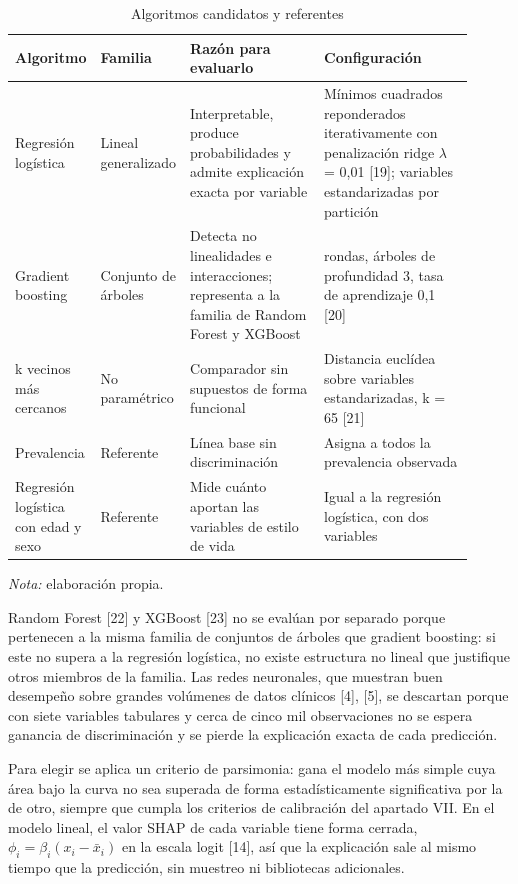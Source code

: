 \documentclass[conference]{IEEEtran}
\begin{document}
\begin{table}[!t]
\centering
\caption{Algoritmos candidatos y referentes}
\footnotesize
\renewcommand{\arraystretch}{1.15}
\begin{tabular}{>{\raggedright\arraybackslash}p{0.110\linewidth}>{\raggedright\arraybackslash}p{0.110\linewidth}>{\raggedright\arraybackslash}p{0.325\linewidth}>{\raggedright\arraybackslash}p{0.367\linewidth}}
\hline
\textbf{Algoritmo} & \textbf{Familia} & \textbf{Razón para evaluarlo} & \textbf{Configuración} \\ \hline
Regresión logística & Lineal generalizado & Interpretable, produce probabilidades y admite explicación exacta por variable & Mínimos cuadrados reponderados iterativamente con penalización ridge $\lambda$ = 0{,}01 [19]; variables estandarizadas por partición \\ \hline
Gradient boosting & Conjunto de árboles & Detecta no linealidades e interacciones; representa a la familia de Random Forest y XGBoost & 100 rondas, árboles de profundidad 3, tasa de aprendizaje 0{,}1 [20] \\ \hline
k vecinos más cercanos & No paramétrico & Comparador sin supuestos de forma funcional & Distancia euclídea sobre variables estandarizadas, k = 65 [21] \\ \hline
Prevalencia & Referente & Línea base sin discriminación & Asigna a todos la prevalencia observada \\ \hline
Regresión logística con edad y sexo & Referente & Mide cuánto aportan las variables de estilo de vida & Igual a la regresión logística, con dos variables \\ \hline
\end{tabular}
\par\smallskip\parbox{\linewidth}{\scriptsize\textit{Nota:} elaboración propia.}
\end{table}
Random Forest [22] y XGBoost [23] no se evalúan por separado porque pertenecen a la misma familia de conjuntos de árboles que gradient boosting: si este no supera a la regresión logística, no existe estructura no lineal que justifique otros miembros de la familia. Las redes neuronales, que muestran buen desempeño sobre grandes volúmenes de datos clínicos [4], [5], se descartan porque con siete variables tabulares y cerca de cinco mil observaciones no se espera ganancia de discriminación y se pierde la explicación exacta de cada predicción.

Para elegir se aplica un criterio de parsimonia: gana el modelo más simple cuya área bajo la curva no sea superada de forma estadísticamente significativa por la de otro, siempre que cumpla los criterios de calibración del apartado VII. En el modelo lineal, el valor SHAP de cada variable tiene forma cerrada, $\phi_i = \beta_i (x_i - \bar{x}_i)$ en la escala logit [14], así que la explicación sale al mismo tiempo que la predicción, sin muestreo ni bibliotecas adicionales.
\end{document}
